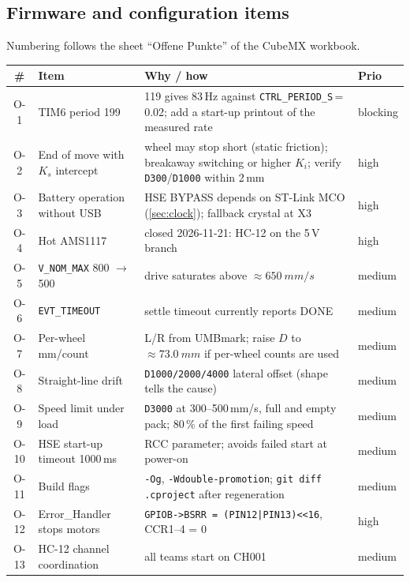 \documentclass[11pt,a4paper]{article}
\newcommand{\tw}[1]{{\small\textcolor{warn}{\textsf{#1}}}}
\newcommand{\tk}[1]{{\small\textcolor{cold}{\textsf{#1}}}}
\newcommand{\tb}[1]{{\small\textcolor{bad}{\textsf{#1}}}}
\newcommand{\code}[1]{\texttt{\small #1}}
\begin{document}
\subsection{Firmware and configuration items}\label{sec:open-fw}

Numbering follows the sheet ``Offene Punkte'' of the CubeMX workbook.

\begin{center}
\small
\begin{tabularx}{\textwidth}{@{}cP{40mm}Ll@{}}
\toprule
\# & \textbf{Item} & \textbf{Why / how} & \textbf{Prio}\\
\midrule
O-1 & TIM6 period 199 & 119 gives 83\,Hz against \code{CTRL\_PERIOD\_S}\,=\,0.02; add a start-up printout of the measured rate & \tb{blocking}\\
O-2 & End of move with $K_s$ intercept & wheel may stop short (static friction); breakaway switching or higher $K_i$; verify \code{D300}/\code{D1000} within 2\,mm & \tw{high}\\
O-3 & Battery operation without USB & HSE BYPASS depends on ST-Link MCO (\cref{sec:clock}); fallback crystal at X3 & \tw{high}\\
O-4 & Hot AMS1117 & closed 2026-11-21: HC-12 on the 5\,V branch & \tw{high}\\
O-5 & \code{V\_NOM\_MAX} 800 $\to$ 500 & drive saturates above $\approx\qty{650}{mm/s}$ & \tk{medium}\\
O-6 & \code{EVT\_TIMEOUT} & settle timeout currently reports DONE & \tk{medium}\\
O-7 & Per-wheel mm/count & L/R from UMBmark; raise $D$ to $\approx\qty{73.0}{mm}$ if per-wheel counts are used & \tk{medium}\\
O-8 & Straight-line drift & \code{D1000/2000/4000} lateral offset (shape tells the cause) & \tk{medium}\\
O-9 & Speed limit under load & \code{D3000} at 300--500\,mm/s, full and empty pack; 80\,\% of the first failing speed & \tk{medium}\\
O-10 & HSE start-up timeout 1000\,ms & RCC parameter; avoids failed start at power-on & \tk{medium}\\
O-11 & Build flags & \code{-Og}, \code{-Wdouble-promotion}; \code{git diff .cproject} after regeneration & \tk{medium}\\
O-12 & Error\_Handler stops motors & \code{GPIOB->BSRR = (PIN12|PIN13)<<16}, CCR1--4 = 0 & \tw{high}\\
O-13 & HC-12 channel coordination & all teams start on CH001 & \tk{medium}\\

\end{tabularx}
\end{center}
\end{document}
